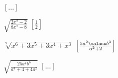 \begin{esercizio}[\Ast]
\begin{multicols}{2}
\begin{enumeratea}
  \hfill $\left[...\right]$
 \item $\sqrt{\frac{2x^2-2}{8x^2-8}}$
  \hfill $\left[\frac 1 2\right]$
 \item $\sqrt[9]{x^6+3x^5+3x^4+x^3}$
  \hfill $\left[\frac{5a^2\valass b^3}{a^2+2}\right]$
 \item $\sqrt{\frac{25a^4b^6}{a^4+4+4a^2}}$
  \hfill $\left[...\right]$
 \end{enumeratea}
 \end{multicols}
\end{esercizio}



